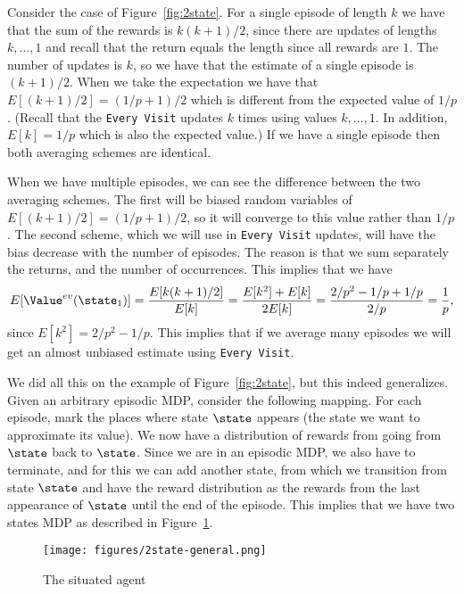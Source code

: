 Consider the case of Figure~\ref{fig:2state}. For a single episode
of length $k$ we have that the sum of the rewards is $k(k+1)/2$,
since there are updates of lengths $k, \ldots , 1$ and recall that
the return equals the length since all rewards are $1$. The number
of updates is $k$, so we have that the estimate of a single episode
is $(k+1)/2$. When we take the expectation we have that
$E[(k+1)/2]=(1/p+1)/2$ which is different from the expected value of
$1/p$. (Recall that the {\tt Every Visit} updates $k$ times using
values $k,\ldots,1$. In addition, $E[k]=1/p$ which is also the
expected value.) If we have a single episode then both averaging
schemes are identical.

When we have multiple episodes, we can see the difference between
the two averaging schemes. The first will be biased random variables
of $E[(k+1)/2]=(1/p+1)/2$, so it will converge to this value rather
than $1/p$. The second scheme, which we will use in {\tt Every
Visit} updates, will have the bias decrease with the number of
episodes. The reason is that we sum separately the returns, and the
number of occurrences. This implies that we have
\[
E[\Value^{ev}(\state_1)]=\frac{E[k(k+1)/2]}{E[k]}=\frac{E[k^2]+E[k]}{2E[k]}=
\frac{2/p^2-1/p+1/p}{2/p}=\frac{1}{p},
\]
since $E[k^2]=2/p^2-1/p$. This implies that if we average many
episodes we will get an almost unbiased estimate using {\tt Every
Visit}.

We did all this on the example of Figure~\ref{fig:2state}, but this
indeed generalizes. Given an arbitrary episodic MDP, consider the
following mapping. For each episode, mark the places where state
$\state$ appears (the state we want to approximate its value). We
now have a distribution of rewards from going from $\state$ back to
$\state$. Since we are in an episodic MDP, we also have to
terminate, and for this we can add another state, from which we
transition from state $\state$ and have the reward distribution as
the rewards from the last appearance of $\state$ until the end of
the episode.
This implies that we have two states MDP as described in
Figure~\ref{fig:2state-general}.


\begin{figure}
  \begin{centering}
  \texttt{[image: figures/2state-general.png]}\\
  \caption{The situated agent}\label{fig:2state-general}
  \end{centering}
\end{figure}


